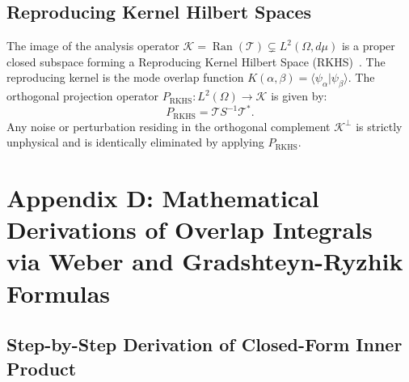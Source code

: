 \documentclass{optica-article}
\begin{document}
\subsection{Reproducing Kernel Hilbert Spaces}

The image of the analysis operator $\mathcal{K} = \operatorname{Ran}(\mathcal{T}) \subsetneq L^2(\Omega, d\mu)$ is a proper closed subspace forming a Reproducing Kernel Hilbert Space (RKHS)~\cite{PaulsenRaghupathi2016}. The reproducing kernel is the mode overlap function $K(\alpha, \beta) = \langle \psi_\alpha | \psi_\beta \rangle$. The orthogonal projection operator $P_{\text{RKHS}}: L^2(\Omega) \to \mathcal{K}$ is given by:
\begin{equation}
P_{\text{RKHS}} = \mathcal{T} S^{-1} \mathcal{T}^*.
\label{eq:app_rkhs_proj}
\end{equation}
Any noise or perturbation residing in the orthogonal complement $\mathcal{K}^\perp$ is strictly unphysical and is identically eliminated by applying $P_{\text{RKHS}}$.

\section{Appendix D: Mathematical Derivations of Overlap Integrals via Weber and Gradshteyn-Ryzhik Formulas}
\label{app:derivations}

\subsection{Step-by-Step Derivation of Closed-Form Inner Product}
\end{document}
